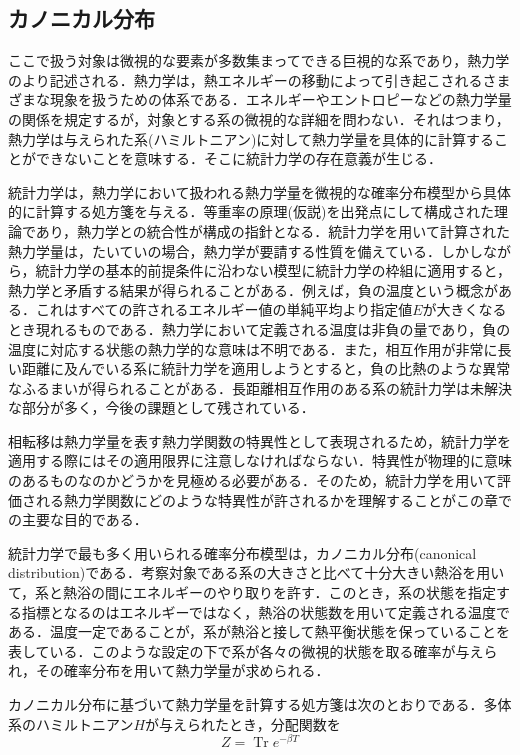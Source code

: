 \documentclass[a4paper,11pt]{jsarticle}
\begin{document}
\subsection{カノニカル分布}
ここで扱う対象は微視的な要素が多数集まってできる巨視的な系であり，熱力学のより記述される．熱力学は，熱エネルギーの移動によって引き起こされるさまざまな現象を扱うための体系である．エネルギーやエントロピーなどの熱力学量の関係を規定するが，対象とする系の微視的な詳細を問わない．それはつまり，熱力学は与えられた系(ハミルトニアン)に対して熱力学量を具体的に計算することができないことを意味する．そこに統計力学の存在意義が生じる．\par
統計力学は，熱力学において扱われる熱力学量を微視的な確率分布模型から具体的に計算する処方箋を与える．等重率の原理(仮説)を出発点にして構成された理論であり，熱力学との統合性が構成の指針となる．統計力学を用いて計算された熱力学量は，たいていの場合，熱力学が要請する性質を備えている．しかしながら，統計力学の基本的前提条件に沿わない模型に統計力学の枠組に適用すると，熱力学と矛盾する結果が得られることがある．例えば，負の温度という概念がある．これはすべての許されるエネルギー値の単純平均より指定値$E$が大きくなるとき現れるものである．熱力学において定義される温度は非負の量であり，負の温度に対応する状態の熱力学的な意味は不明である．また，相互作用が非常に長い距離に及んでいる系に統計力学を適用しようとすると，負の比熱のような異常なふるまいが得られることがある．長距離相互作用のある系の統計力学は未解決な部分が多く，今後の課題として残されている．\par
相転移は熱力学量を表す熱力学関数の特異性として表現されるため，統計力学を適用する際にはその適用限界に注意しなければならない．特異性が物理的に意味のあるものなのかどうかを見極める必要がある．そのため，統計力学を用いて評価される熱力学関数にどのような特異性が許されるかを理解することがこの章での主要な目的である．\par
統計力学で最も多く用いられる確率分布模型は，カノニカル分布(canonical distribution)である．考察対象である系の大きさと比べて十分大きい熱浴を用いて，系と熱浴の間にエネルギーのやり取りを許す．このとき，系の状態を指定する指標となるのはエネルギーではなく，熱浴の状態数を用いて定義される温度である．温度一定であることが，系が熱浴と接して熱平衡状態を保っていることを表している．このような設定の下で系が各々の微視的状態を取る確率が与えられ，その確率分布を用いて熱力学量が求められる．\par
カノニカル分布に基づいて熱力学量を計算する処方箋は次のとおりである．多体系のハミルトニアン$H$が与えられたとき，分配関数を
\begin{equation}
  Z = \operatorname{Tr}e^{-\beta T}
\end{equation}
\end{document}
